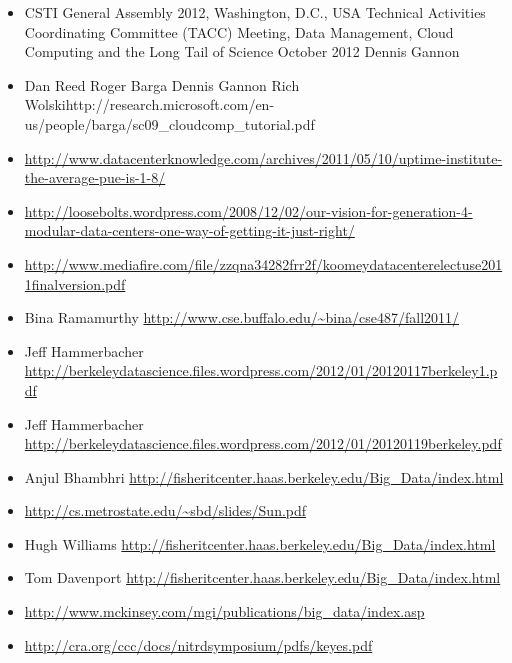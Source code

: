 \begin{itemize}
\tightlist
\item
  CSTI General Assembly 2012, Washington, D.C., USA Technical Activities
  Coordinating Committee (TACC) Meeting, Data Management, Cloud
  Computing and the Long Tail of Science October 2012 Dennis Gannon
\item
  Dan Reed Roger Barga Dennis Gannon Rich
  Wolskihttp://research.microsoft.com/en-us/people/barga/sc09\_cloudcomp\_tutorial.pdf
\item
  \url{http://www.datacenterknowledge.com/archives/2011/05/10/uptime-institute-the-average-pue-is-1-8/}
\item
  \url{http://loosebolts.wordpress.com/2008/12/02/our-vision-for-generation-4-modular-data-centers-one-way-of-getting-it-just-right/}
\item
  \url{http://www.mediafire.com/file/zzqna34282frr2f/koomeydatacenterelectuse2011finalversion.pdf}
\item
  Bina Ramamurthy
  \url{http://www.cse.buffalo.edu/~bina/cse487/fall2011/}
\item
  Jeff Hammerbacher
  \url{http://berkeleydatascience.files.wordpress.com/2012/01/20120117berkeley1.pdf}
\item
  Jeff Hammerbacher
  \url{http://berkeleydatascience.files.wordpress.com/2012/01/20120119berkeley.pdf}
\item
  Anjul Bhambhri
  \url{http://fisheritcenter.haas.berkeley.edu/Big_Data/index.html}
\item
  \url{http://cs.metrostate.edu/~sbd/slides/Sun.pdf}
\item
  Hugh Williams
  \url{http://fisheritcenter.haas.berkeley.edu/Big_Data/index.html}
\item
  Tom Davenport
  \url{http://fisheritcenter.haas.berkeley.edu/Big_Data/index.html}
\item
  \url{http://www.mckinsey.com/mgi/publications/big_data/index.asp}
\item
  \url{http://cra.org/ccc/docs/nitrdsymposium/pdfs/keyes.pdf}
\end{itemize}
